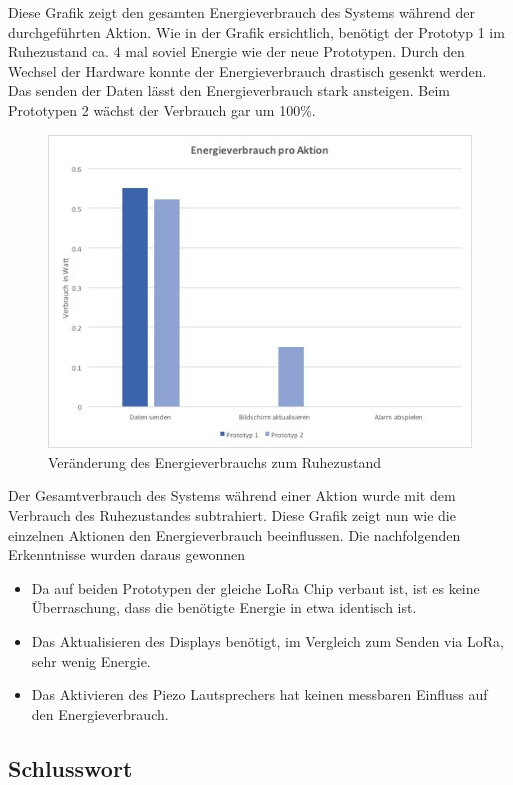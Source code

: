 \documentclass[11pt,english,german]{report}
\theoremstyle{definition}
\begin{document}
\noindent
Diese Grafik zeigt den gesamten Energieverbrauch des Systems während der durchgeführten Aktion.
Wie in der Grafik ersichtlich, benötigt der Prototyp 1 im Ruhezustand ca. 4 mal soviel Energie wie der neue Prototypen. Durch den Wechsel der Hardware konnte der Energieverbrauch drastisch gesenkt werden.\\[0.3cm]
Das senden der Daten lässt den Energieverbrauch stark ansteigen. Beim Prototypen 2 wächst der Verbrauch gar um 100\%.
\newpage
\begin{figure}[H]
\centering
\includegraphics[width=\textwidth]{img/testing/energy_usage_perAction.jpg}
\caption[Veränderung des Energieverbrauchs zum Ruhezustand]
{Veränderung des Energieverbrauchs zum Ruhezustand}
\end{figure}
\noindent
Der Gesamtverbrauch des Systems während einer Aktion wurde mit dem Verbrauch des Ruhezustandes subtrahiert. Diese Grafik zeigt nun wie die einzelnen Aktionen den Energieverbrauch beeinflussen. Die nachfolgenden Erkenntnisse wurden daraus gewonnen
\begin{itemize}
\item Da auf beiden Prototypen der gleiche LoRa Chip verbaut ist, ist es keine Überraschung, dass die benötigte Energie in etwa identisch ist. 
\item Das Aktualisieren des Displays benötigt, im Vergleich zum Senden via LoRa,  sehr wenig Energie.
\item Das Aktivieren des Piezo Lautsprechers hat keinen messbaren Einfluss auf den Energieverbrauch.
\end{itemize}

\newpage
\subsection{Schlusswort}
\end{document}
